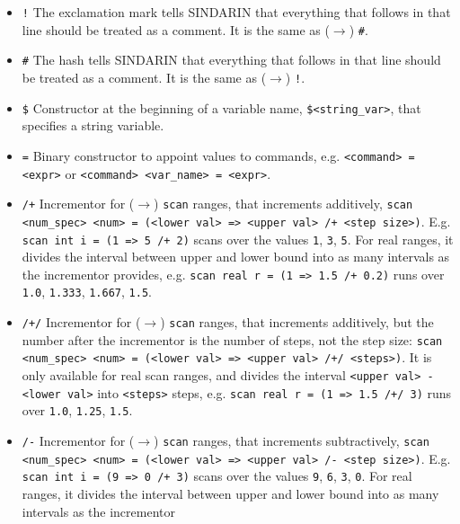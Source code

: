 \documentclass[12pt]{book}
\newcommand{\ttt}[1]{\texttt{#1}}
\begin{document}
\begin{itemize}
\item
\ttt{!} \newline
The exclamation mark tells SINDARIN that everything that follows in
that line should be treated as a comment. It is the same as ($\to$)
\ttt{\#}. 
\item
\ttt{\#} \newline
The hash tells SINDARIN that everything that follows in
that line should be treated as a comment. It is the same as ($\to$)
\ttt{!}. 
\item
\ttt{\$} \newline
Constructor at the beginning of a variable name,
\ttt{\$<string\_var>}, that specifies a string variable.  
\item
\ttt{=} \newline
Binary constructor to appoint values to commands, e.g. \ttt{<command>
  = <expr>} or \newline \ttt{<command> <var\_name> = <expr>}.
\item
\ttt{/+} \newline
Incrementor for ($\to$) \ttt{scan} ranges, that increments additively,
\ttt{scan <num\_spec> <num> = (<lower val> => <upper val> /+ <step
size>)}. E.g. \ttt{scan int i = (1 => 5 /+ 2)} scans over the values \ttt{1}, 
\ttt{3}, \ttt{5}. For real ranges, it divides the interval between
upper and lower bound into as many intervals as the incrementor
provides, e.g. \ttt{scan real r = (1 => 1.5 /+ 0.2)} runs over 
\ttt{1.0}, \ttt{1.333}, \ttt{1.667}, \ttt{1.5}. 
\item
\ttt{/+/} \newline
Incrementor for ($\to$) \ttt{scan} ranges, that increments additively, 
but the number after the incrementor is the number of steps, not the
step size: \ttt{scan <num\_spec> <num> = (<lower val> => <upper val>
/+/ <steps>)}. It is only available for real scan ranges, and divides
the interval \ttt{<upper val> - <lower val>} into \ttt{<steps>} steps,
e.g. \ttt{scan real r = (1 => 1.5 /+/ 3)} runs over \ttt{1.0},
\ttt{1.25}, \ttt{1.5}.
\item
\ttt{/-} \newline
Incrementor for ($\to$) \ttt{scan} ranges, that increments subtractively,
\ttt{scan <num\_spec> <num> = (<lower val> => <upper val> /- <step
size>)}. E.g. \ttt{scan int i = (9 => 0 /+ 3)} scans over the values \ttt{9}, 
\ttt{6}, \ttt{3}, \ttt{0}. For real ranges, it divides the interval
between upper and lower bound into as many intervals as the incrementor

\end{itemize}
\end{document}
